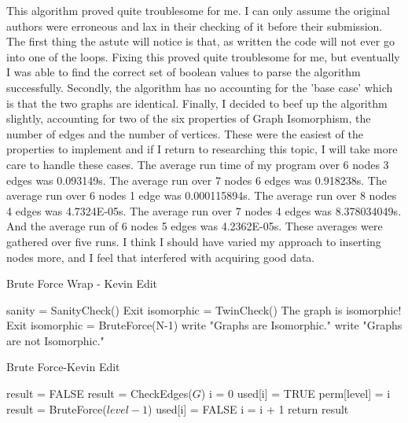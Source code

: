 \documentclass[notitlepage]{report}
\begin{document}
This algorithm proved quite troublesome for me. I can only assume the original authors were erroneous and lax in their checking of it before their submission. The first thing the astute will notice is that, as written the code will not ever go into one of the loops. Fixing this proved quite troublesome for me, but eventually I was able to find the correct set of boolean values to parse the algorithm successfully. Secondly, the algorithm has no accounting for the 'base case' which is that the two graphs are identical. Finally, I decided to beef up the algorithm slightly, accounting for two of the six properties of Graph Isomorphism, the number of edges and the number of vertices. These were the easiest of the properties to implement and if I return to researching this topic, I will take more care to handle these cases. The average run time of my program over 6 nodes 3 edges was 0.093149s. The average run over 7 nodes 6 edges was 0.918238s. The average run over 6 nodes 1 edge was 0.000115894s. The average run over 8 nodes 4 edges was 4.7324E-05s. The average run over 7 nodes 4 edges was 8.378034049s. And the average run of 6 nodes 5 edges was 4.2362E-05s. These averages were gathered over five runs. I think I should have varied my approach to inserting nodes more, and I feel that interfered with acquiring good data.

\begin{algorithm}
\caption{Brute Force Wrap - Kevin Edit}
\begin{algorithmic}[1]

    \State sanity = SanityCheck()
    	\State Exit
    \EndIf
    \State isomorphic = TwinCheck()
    	\State The graph is isomorphic! Exit
   	\EndIf
   	\State isomorphic = BruteForce(N-1)
        \State write "Graphs are Isomorphic."
    \Else
    	\State write "Graphs are not Isomorphic."
    \EndIf
    \label{A2}
\EndProcedure
\end{algorithmic}
\end{algorithm}

\begin{algorithm}
\caption{Brute Force-Kevin Edit}
\begin{algorithmic}[1]

    \State result = FALSE 								
    	\State result = CheckEdges($G$)
    \Else
    	\State i = 0
	    				
	        	\State used[i] = TRUE 					
	        	\State perm[level] = i
	        	\State result = BruteForce($level - 1$)
	        	\State used[i] = FALSE					
	        \EndIf
	        \State i = i + 1	
	    \EndWhile
	\EndIf
	\State return result
\label{BruteForce2}
\EndProcedure

\end{algorithmic}
\end{algorithm}
\end{document}
